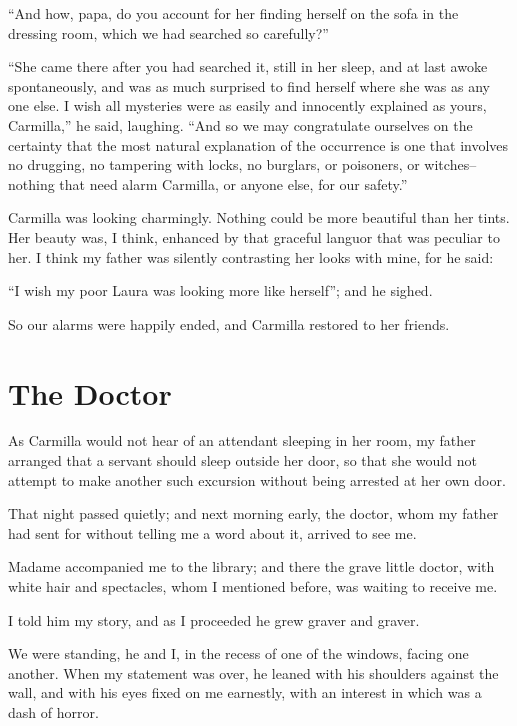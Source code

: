 \documentclass[11pt,twoside,makeidx,hidelinks,]{memoir}
\begin{document}
``And how, papa, do you account for her finding herself on the sofa in
the dressing room, which we had searched so carefully?''

``She came there after you had searched it, still in her sleep, and at
last awoke spontaneously, and was as much surprised to find herself
where she was as any one else. I wish all mysteries were as easily and
innocently explained as yours, Carmilla,'' he said, laughing. ``And so we
may congratulate ourselves on the certainty that the most natural
explanation of the occurrence is one that involves no drugging, no
tampering with locks, no burglars, or poisoners, or witches--nothing
that need alarm Carmilla, or anyone else, for our safety.''

Carmilla was looking charmingly. Nothing could be more beautiful than
her tints. Her beauty was, I think, enhanced by that graceful languor
that was peculiar to her. I think my father was silently contrasting her
looks with mine, for he said:

``I wish my poor Laura was looking more like herself''; and he sighed.

So our alarms were happily ended, and Carmilla restored to her friends.

\pbreak{}

\chapter{The Doctor}\hypertarget{the-doctor}{}\label{the-doctor}

As Carmilla would not hear of an attendant sleeping in her room, my
father arranged that a servant should sleep outside her door, so that
she would not attempt to make another such excursion without being
arrested at her own door.

That night passed quietly; and next morning early, the doctor, whom my
father had sent for without telling me a word about it, arrived to
see me.

Madame accompanied me to the library; and there the grave little doctor,
with white hair and spectacles, whom I mentioned before, was waiting to
receive me.

I told him my story, and as I proceeded he grew graver and graver.

We were standing, he and I, in the recess of one of the windows, facing
one another. When my statement was over, he leaned with his shoulders
against the wall, and with his eyes fixed on me earnestly, with an
interest in which was a dash of horror.
\end{document}
